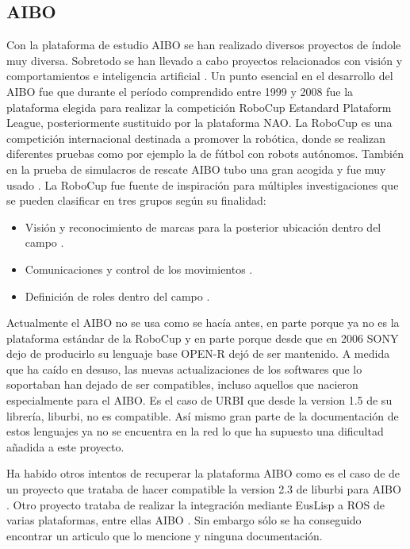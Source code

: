 \documentclass[12pt,a4paper,final,twoside]{book}
\begin{document}
\subsection{AIBO}

Con la plataforma de estudio AIBO se han realizado diversos proyectos de índole muy diversa. Sobretodo se han llevado a cabo proyectos relacionados con visión \cite{xavi} y comportamientos e inteligencia artificial \cite{riki}.
Un punto esencial en el desarrollo del AIBO fue que durante el período comprendido entre 1999 y 2008 fue la plataforma elegida para realizar la competición RoboCup Estandard Plataform League, posteriormente sustituido por la plataforma NAO. La RoboCup es una competición internacional destinada a promover la robótica, donde se realizan diferentes pruebas como por ejemplo la de fútbol con robots autónomos. También en la prueba de simulacros de rescate AIBO tubo una gran acogida y fue muy usado \cite{robocup}.
La RoboCup fue fuente de inspiración para múltiples investigaciones que se pueden clasificar en tres grupos según su finalidad:
\begin{itemize}
\item Visión y reconocimiento de marcas para la posterior ubicación dentro del campo \cite{morales}.
\item Comunicaciones y control de los movimientos \cite{jesus}.
\item Definición de roles dentro del campo \cite{metod}.
\end{itemize}

Actualmente el AIBO no se usa como se hacía antes, en parte porque ya no es la plataforma estándar de la RoboCup y en parte porque desde que en 2006 SONY dejo de producirlo su lenguaje base OPEN-R\cite{OPEN-R PG} dejó de ser mantenido.
A medida que ha caído en desuso, las nuevas actualizaciones de los softwares que lo soportaban han dejado de ser compatibles, incluso aquellos que nacieron especialmente para el AIBO. Es el caso de URBI que desde la version 1.5 de su librería, liburbi, no es compatible.
Así mismo gran parte de la documentación de estos lenguajes ya no se encuentra en la red lo que ha supuesto una dificultad añadida a este proyecto.

Ha habido otros intentos de recuperar la plataforma AIBO como es el caso de de un proyecto que trataba de hacer compatible la version 2.3 de liburbi para AIBO \cite{kecsap}.
Otro proyecto   trataba de realizar la integración mediante EusLisp a ROS de varias plataformas, entre ellas AIBO \cite{euslisp}. Sin embargo sólo se ha conseguido encontrar un articulo que lo mencione y ninguna documentación.
\end{document}
